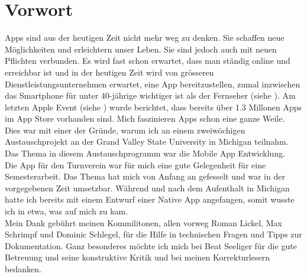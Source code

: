 \chapter*{Vorwort}\label{vorwort}
Apps sind aus der heutigen Zeit nicht mehr weg zu denken. Sie schaffen neue Möglichkeiten und erleichtern unser Leben. Sie sind jedoch auch mit neuen Pflichten verbunden. Es wird fast schon erwartet, dass man ständig online und erreichbar ist und in der heutigen Zeit wird von grösseren Dienstleistungsunternehmen erwartet, eine App bereitzustellen, zumal inzwischen das Smartphone für unter 40-jährige wichtiger ist als der Fernseher (siehe \cite{digitalisierungsbericht2014}). Am letzten Apple Event (siehe \cite{apple_event_sept_2014}) wurde berichtet, dass bereits über 1.3 Millonen Apps im App Store vorhanden sind. Mich faszinieren Apps schon eine ganze Weile. Dies war mit einer der Gründe, warum ich an einem zweiwöchigen Austauschprojekt an der Grand Valley State University in Michigan teilnahm. Das Thema in diesem Austauschprogramm war die Mobile App Entwicklung.\\

Die App für den Turnverein war für mich eine gute Gelegenheit für eine Semesterarbeit. Das Thema hat mich von Anfang an gefesselt und war in der vorgegebenen Zeit umsetzbar. Während und nach dem Aufenthalt in Michigan hatte ich bereits mit einem Entwurf einer Native App angefangen, somit wusste ich in etwa, was auf mich zu kam.\\

Mein Dank gebührt meinen Kommilitonen, allen vorweg Roman Lickel, Max Schrimpf und Dominic Schlegel, für die Hilfe in technischen Fragen und Tipps zur Dokumentation. Ganz besonderes möchte ich mich bei Beat Seeliger für die gute Betreuung und seine konstruktive Kritik und bei meinen Korrekturlesern bedanken.